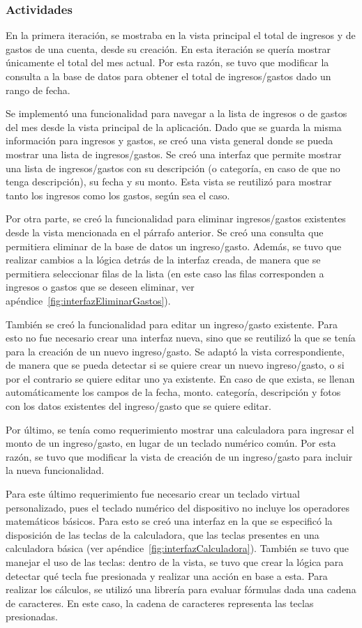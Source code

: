 \subsubsection{Actividades}

En la primera iteración, se mostraba en la vista principal el total de ingresos y de gastos de una cuenta, desde su creación. En esta iteración se quería mostrar únicamente el total del mes actual. Por esta razón, se tuvo que modificar la consulta a la base de datos para obtener el total de ingresos/gastos dado un rango de fecha.

Se implementó una funcionalidad para navegar a la lista de ingresos o de gastos del mes desde la vista principal de la aplicación. Dado que se guarda la misma información para ingresos y gastos, se creó una vista general donde se pueda mostrar una lista de ingresos/gastos. Se creó una interfaz que permite mostrar una lista de ingresos/gastos con su descripción (o categoría, en caso de que no tenga descripción), su fecha y su monto. Esta vista se reutilizó para mostrar tanto los ingresos como los gastos, según sea el caso.

Por otra parte, se creó la funcionalidad para eliminar ingresos/gastos existentes desde la vista mencionada en el párrafo anterior. Se creó una consulta que permitiera eliminar de la base de datos un ingreso/gasto. Además, se tuvo que realizar cambios a la lógica detrás de la interfaz creada, de manera que se permitiera seleccionar filas de la lista (en este caso las filas corresponden a ingresos o gastos que se deseen eliminar, ver apéndice~\ref{fig:interfazEliminarGastos}). 

También se creó la funcionalidad para editar un ingreso/gasto existente. Para esto no fue necesario crear una interfaz nueva, sino que se reutilizó la que se tenía para la creación de un nuevo ingreso/gasto. Se adaptó la vista correspondiente, de manera que se pueda detectar si se quiere crear un nuevo ingreso/gasto, o si por el contrario se quiere editar uno ya existente. En caso de que exista, se llenan automáticamente los campos de la fecha, monto. categoría, descripción y fotos con los datos existentes del ingreso/gasto que se quiere editar.

Por último, se tenía como requerimiento mostrar una calculadora para ingresar el monto de un ingreso/gasto, en lugar de un teclado numérico común. Por esta razón, se tuvo que modificar la vista de creación de un ingreso/gasto para incluir la nueva funcionalidad. 

Para este último requerimiento fue necesario crear un teclado virtual personalizado, pues el teclado numérico del dispositivo no incluye los operadores matemáticos básicos. Para esto se creó una interfaz en la que se especificó la disposición de las teclas de la calculadora, que las teclas presentes en una calculadora básica (ver apéndice~\ref{fig:interfazCalculadora}). También se tuvo que manejar el uso de las teclas: dentro de la vista, se tuvo que crear la lógica para detectar qué tecla fue presionada y realizar una acción en base a esta. Para realizar los cálculos, se utilizó una librería para evaluar fórmulas dada una cadena de caracteres. En este caso, la cadena de caracteres representa las teclas presionadas.

